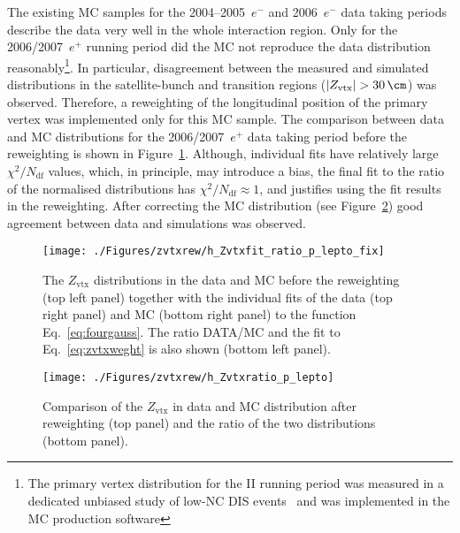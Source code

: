 The existing MC samples for the 2004--2005~$e^-$ and 2006~$e^-$ data taking periods describe the data very well in the whole interaction region. Only for the 2006/2007~$e^+$ running period did the MC not reproduce the data distribution reasonably\footnote{The primary vertex distribution for the \hera II running period was measured in a dedicated unbiased study of low-\qsq NC DIS events~\cite{upub:oliver:zn07008} and was implemented in the MC production software}. In particular, disagreement between the measured and simulated distributions in the satellite-bunch and transition regions ($\left|Z_{\text{vtx}}\right|>30\,\cm$) was observed. Therefore, a reweighting of the longitudinal position of the primary vertex was implemented only for this MC sample. The comparison between data and MC distributions for the 2006/2007~$e^+$ data taking period before the reweighting is shown in Figure~\ref{fig:zvtxrew}. Although, individual fits have relatively large $\chi^2/N_\text{df}$ values, which, in principle, may introduce a bias, the final fit to the ratio of the normalised distributions has $\chi^2/N_\text{df}\approx 1$, and justifies using the fit results in the reweighting. After correcting the MC distribution (see Figure~\ref{fig:zvtxrewaf}) good agreement between data and simulations was observed.
\begin{figure}[t]
\begin{center}
 \hspace{-35pt}\texttt{[image: ./Figures/zvtxrew/h\_Zvtxfit\_ratio\_p\_lepto\_fix]}%
\end{center}
\caption{The $Z_\text{vtx}$ distributions in the data and \lepto MC before the reweighting (top left panel) together with the individual fits of the data (top right panel) and MC (bottom right panel) to the function Eq.~\eqref{eq:fourgauss}. The ratio DATA/MC and the fit to Eq.~\eqref{eq:zvtxweght} is also shown (bottom left panel).} 
\label{fig:zvtxrew}
\end{figure}

\begin{figure}[p]
\begin{center}
 \texttt{[image: ./Figures/zvtxrew/h\_Zvtxratio\_p\_lepto]}
\end{center}
\caption{Comparison of the $Z_\text{vtx}$ in data and \lepto MC distribution after reweighting (top panel) and the ratio of the two distributions (bottom panel).} 
\label{fig:zvtxrewaf}
\end{figure}